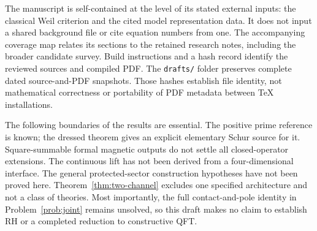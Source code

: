 The manuscript is self-contained at the level of its stated external
inputs: the classical Weil criterion and the cited model representation
data. It does not input a shared background file or cite equation numbers
from one. The accompanying coverage map relates its sections to the
retained research notes, including the broader candidate survey.
Build instructions and a hash record identify the reviewed sources and
compiled PDF. The \texttt{drafts/} folder preserves complete dated
source-and-PDF snapshots. Those hashes establish file identity, not
mathematical correctness or portability of PDF metadata between TeX
installations.

The following boundaries of the results are essential. The positive
prime reference is known; the dressed theorem gives an explicit
elementary Schur source for it. Square-summable formal magnetic
outputs do not settle all closed-operator extensions. The continuous
lift has not been derived from a four-dimensional interface. The
general protected-sector construction hypotheses have not been
proved here. Theorem~\ref{thm:two-channel} excludes one specified
architecture and not a class of theories. Most importantly, the full
contact-and-pole identity in Problem~\ref{prob:joint} remains unsolved, so
this draft makes no claim to establish RH or a completed reduction to
constructive QFT.
